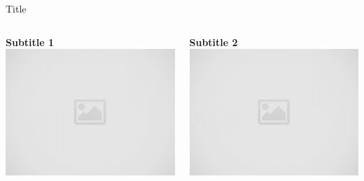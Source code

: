 \documentclass[final]{beamer}
\newlength{\onecolwid}
\newlength{\twocolwid}
\begin{document}
\begin{frame}[t]
\begin{columns}[t]
\begin{column}{\twocolwid}
\begin{columns}[t,totalwidth=\twocolwid]
\begin{column}{\onecolwid}
\begin{block}{Title}
                \begin{columns}
                    \begin{column}[t]{0.48\textwidth}
                        \begin{center}
                            \textbf{Subtitle 1} \\[0.3in]
                            \includegraphics[width=\textwidth,height=.7\textheight,keepaspectratio]{images/placeholder.jpg}
                        \end{center}
                    \end{column}
                    \begin{column}[t]{0.48\textwidth} 
                        \begin{center}
                            \textbf{Subtitle 2} \\[0.3in]
                            \includegraphics[width=\textwidth,height=.7\textheight,keepaspectratio]{images/placeholder.jpg}
                        \end{center}
                    \end{column}
                \end{columns}
            

\end{block}
\end{column}
\end{columns}
\end{column}
\end{columns}
\end{frame}
\end{document}
